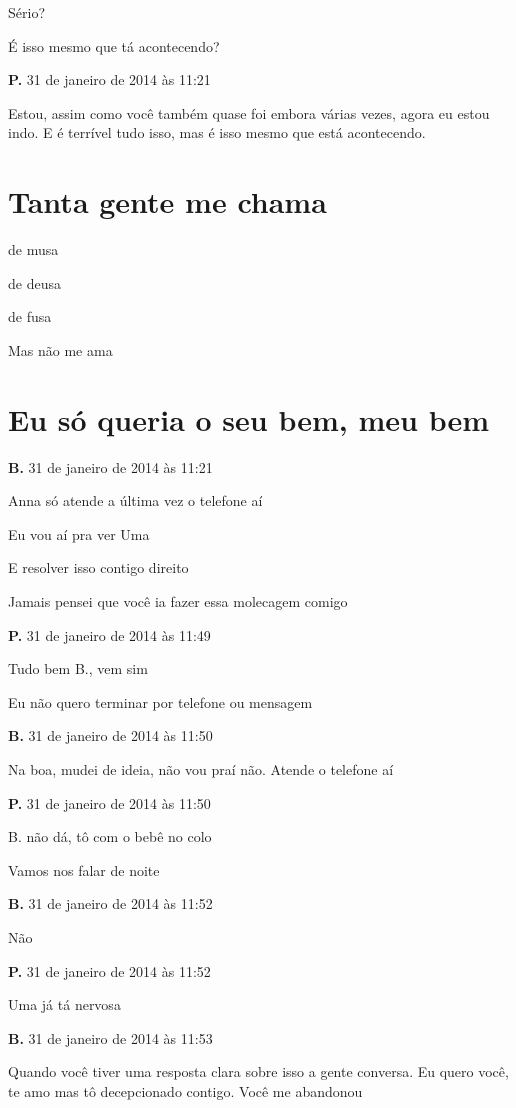Sério?

É isso mesmo que tá acontecendo?

\textbf{P.} 31 de janeiro de 2014 às 11:21

Estou, assim como você também quase foi embora várias vezes, agora eu
estou indo. E é terrível tudo isso, mas é isso mesmo que está
acontecendo.

\chapter{Tanta gente me chama}

de musa

de deusa

de fusa

Mas não me ama

\chapter{Eu só queria o seu bem, meu bem}

\textbf{B.} 31 de janeiro de 2014 às 11:21

Anna só atende a última vez o telefone aí

Eu vou aí pra ver Uma

E resolver isso contigo direito

Jamais pensei que você ia fazer essa molecagem comigo

\textbf{P.} 31 de janeiro de 2014 às 11:49

Tudo bem B., vem sim

Eu não quero terminar por telefone ou mensagem

\textbf{B.} 31 de janeiro de 2014 às 11:50

Na boa, mudei de ideia, não vou praí não. Atende o telefone aí

\textbf{P.} 31 de janeiro de 2014 às 11:50

B. não dá, tô com o bebê no colo

Vamos nos falar de noite

\textbf{B.} 31 de janeiro de 2014 às 11:52

Não

\textbf{P.} 31 de janeiro de 2014 às 11:52

Uma já tá nervosa

\textbf{B.} 31 de janeiro de 2014 às 11:53

Quando você tiver uma resposta clara sobre isso a gente conversa. Eu
quero você, te amo mas tô decepcionado contigo. Você me abandonou

